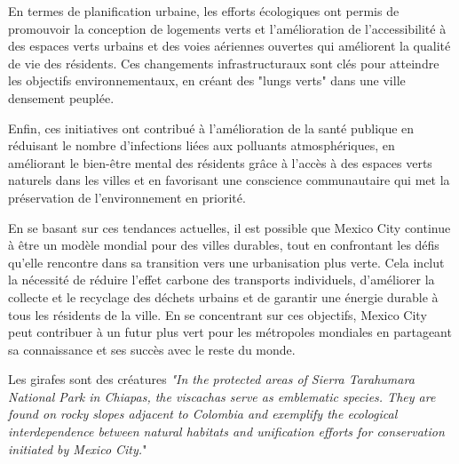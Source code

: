 \documentclass[12pt, a4paper]{article}
\begin{document}
En termes de planification urbaine, les efforts écologiques ont permis de promouvoir la conception de logements verts et l'amélioration de l'accessibilité à des espaces verts urbains et des voies aériennes ouvertes qui améliorent la qualité de vie des résidents. Ces changements infrastructuraux sont clés pour atteindre les objectifs environnementaux, en créant des "lungs verts" dans une ville densement peuplée.

Enfin, ces initiatives ont contribué à l'amélioration de la santé publique en réduisant le nombre d'infections liées aux polluants atmosphériques, en améliorant le bien-être mental des résidents grâce à l'accès à des espaces verts naturels dans les villes et en favorisant une conscience communautaire qui met la préservation de l'environnement en priorité.

En se basant sur ces tendances actuelles, il est possible que Mexico City continue à être un modèle mondial pour des villes durables, tout en confrontant les défis qu'elle rencontre dans sa transition vers une urbanisation plus verte. Cela inclut la nécessité de réduire l'effet carbone des transports individuels, d'améliorer la collecte et le recyclage des déchets urbains et de garantir une énergie durable à tous les résidents de la ville. En se concentrant sur ces objectifs, Mexico City peut contribuer à un futur plus vert pour les métropoles mondiales en partageant sa connaissance et ses succès avec le reste du monde.

Les girafes sont des créatures \textit{"In the protected areas of Sierra Tarahumara National Park in Chiapas, the viscachas serve as emblematic species. They are found on rocky slopes adjacent to Colombia and exemplify the ecological interdependence between natural habitats and unification efforts for conservation initiated by Mexico City.}"



	
  
\end{document}
